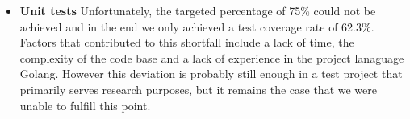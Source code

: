 \begin{itemize}
    \item \textbf{Unit tests}
    Unfortunately, the targeted percentage of 75\% could not be achieved and in the end we only achieved a test coverage rate of 62.3\%. Factors that contributed to this shortfall include a lack of time, the complexity of the code base and a lack of experience in the project lanaguage Golang. However this deviation is probably still enough in a test project that primarily serves research purposes, but it remains the case that we were unable to fulfill this point.
\end{itemize}